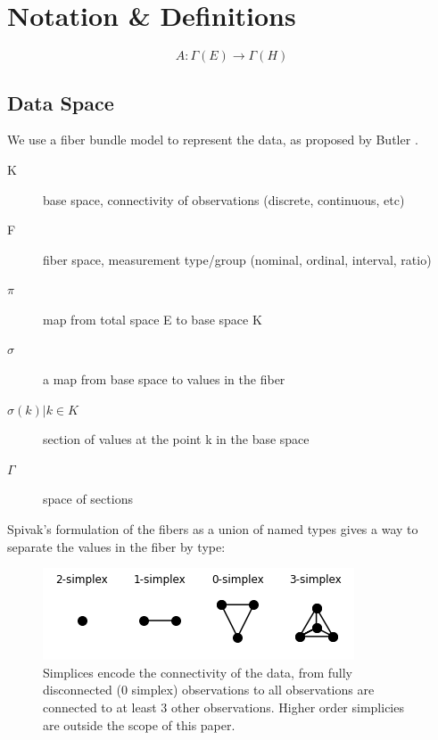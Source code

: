 \documentclass[../intro.tex]{subfiles}
\begin{document}
\section{Notation \& Definitions}

\begin{equation}
    A: \Gamma(E) \rightarrow \Gamma(H)
\end{equation}


\subsection{Data Space}

We use a fiber bundle model to represent the data, as proposed by Butler \cite{BuildSoftwareBetter}. 


\begin{description}
    \item[K] base space, connectivity of observations (discrete, continuous, etc)
    \item[F] fiber space, measurement type/group (nominal, ordinal, interval, ratio)
    \item[$\pi$] map from total space E to base space K
    \item[$\sigma$] a map from base space to values in the fiber
    \item[$\sigma(k)| k \in K $] section of values at the point k in the base space
    \item[$\Gamma$] space of sections 
\end{description}

Spivak's \cite{spivakSIMPLICIALDATABASES} formulation of the fibers as a union of named types gives a way to separate the values in the fiber by type:





\begin{figure}[h]
    \label{fig:simplex}
    \includegraphics{figures/sections/math/simplex.png}
    \caption{Simplices encode the connectivity of the data, from fully disconnected (0 simplex) observations to all observations are connected to at least 3 other observations. Higher order simplicies are outside the scope of this paper.}
\end{figure}
\end{document}
